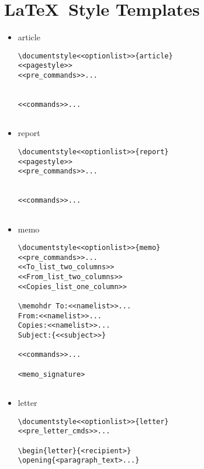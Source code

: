 \newpage
\section{\LaTeX\ Style Templates}
\label{templates}

\begin{itemize}

\item article

\begin{small}
\begin{verbatim}
\documentstyle<<optionlist>>{article}
<<pagestyle>>
<<pre_commands>>...


<<commands>>...


\end{verbatim}
\end{small}

\item report

\begin{small}
\begin{verbatim}
\documentstyle<<optionlist>>{report}
<<pagestyle>>
<<pre_commands>>...


<<commands>>...


\end{verbatim}
\end{small}

\item memo

\begin{small}
\begin{verbatim}
\documentstyle<<optionlist>>{memo}
<<pre_commands>>...
<<To_list_two_columns>>
<<From_list_two_columns>>
<<Copies_list_one_column>>

\memohdr To:<<namelist>>...
From:<<namelist>>...
Copies:<<namelist>>...
Subject:{<<subject>>}

<<commands>>...

<memo_signature>


\end{verbatim}
\end{small}

\newpage

\item letter

\begin{small}
\begin{verbatim}
\documentstyle<<optionlist>>{letter}
<<pre_letter_cmds>>...

\begin{letter}{<recipient>}
\opening{<paragraph_text>...}


\end{verbatim}
\end{small}
\end{itemize}
